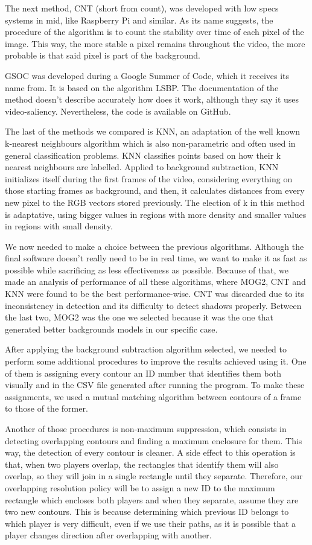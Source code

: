 The next method, CNT (short from count), was developed with low specs systems in mid, like Raspberry Pi and similar. As its name suggests, the procedure of the algorithm is to count the stability over time of each pixel of the image. This way, the more stable a pixel remains throughout the video, the more probable is that said pixel is part of the background.

GSOC was developed during a Google Summer of Code, which it receives its name from. It is based on the algorithm LSBP. The documentation of the method doesn’t describe accurately how does it work, although they say it uses video-saliency. Nevertheless, the code is available on GitHub.

The last of the methods we compared is KNN, an adaptation of the well known k-nearest neighbours algorithm which is also non-parametric and often used in general classification problems. KNN classifies points based on how their k nearest neighbours are labelled. Applied to background subtraction, KNN initializes itself during the first frames of the video, considering everything on those starting frames as background, and then, it calculates distances from every new pixel to the RGB vectors stored previously. The election of k in this method is adaptative, using bigger values in regions with more density and smaller values in regions with small density.

We now needed to make a choice between the previous algorithms. Although the final software doesn’t really need to be in real time, we want to make it as fast as possible while sacrificing as less effectiveness as possible. Because of that, we made an analysis of performance of all these algorithms, where MOG2, CNT and KNN were found to be the best performance-wise. CNT was discarded due to its inconsistency in detection and its difficulty to detect shadows properly. Between the last two, MOG2 was the one we selected because it was the one that generated better backgrounds models in our specific case. 

After applying the background subtraction algorithm selected, we needed to perform some additional procedures to improve the results achieved using it. One of them is assigning every contour an ID number that identifies them both visually and in the CSV file generated after running the program. To make these assignments, we used a mutual matching algorithm between contours of a frame to those of the former.

Another of those procedures is non-maximum suppression, which consists in detecting overlapping contours and finding a maximum enclosure for them. This way, the detection of every contour is cleaner. A side effect to this operation is that, when two players overlap, the rectangles that identify them will also overlap, so they will join in a single rectangle until they separate. Therefore, our overlapping resolution policy will be to assign a new ID to the maximum rectangle which encloses both players and when they separate, assume they are two new contours. This is because determining which previous ID belongs to which player is very difficult, even if we use their paths, as it is possible that a player changes direction after overlapping with another.

